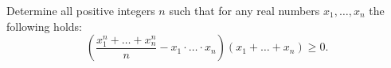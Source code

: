 Determine all positive integers $n$ such that for any real numbers $x_1, \ldots, x_n$ the following holds:
$$\left(\frac{x_1^n + \ldots + x_n^n}{n} - x_1 \cdot\ldots\cdot x_n\right) \left(x_1 + \ldots + x_n \right) \geq 0.$$